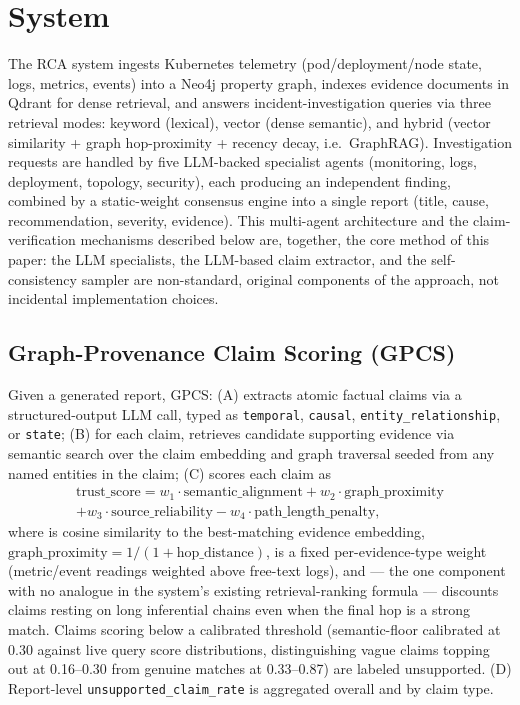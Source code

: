 \documentclass{article}
\begin{document}
\section{System}
\label{sec:system}

The RCA system ingests Kubernetes telemetry (pod/deployment/node state,
logs, metrics, events) into a Neo4j property graph, indexes evidence
documents in Qdrant for dense retrieval, and answers incident-investigation
queries via three retrieval modes: keyword (lexical), vector (dense
semantic), and hybrid (vector similarity + graph hop-proximity + recency
decay, i.e.\ GraphRAG). Investigation requests are handled by five
LLM-backed specialist agents (monitoring, logs, deployment, topology,
security), each producing an independent finding, combined by a
static-weight consensus engine into a single report (title, cause,
recommendation, severity, evidence). This multi-agent architecture and the
claim-verification mechanisms described below are, together, the core
method of this paper: the LLM specialists, the LLM-based claim extractor,
and the self-consistency sampler are non-standard, original components of
the approach, not incidental implementation choices.

\subsection{Graph-Provenance Claim Scoring (GPCS)}
\label{sec:gpcs}

Given a generated report, GPCS: (A) extracts atomic factual claims via a
structured-output LLM call, typed as \texttt{temporal}, \texttt{causal},
\texttt{entity\_relationship}, or \texttt{state}; (B) for each claim,
retrieves candidate supporting evidence via semantic search over the claim
embedding and graph traversal seeded from any named entities in the
claim; (C) scores each claim as
\begin{multline}
    \text{trust\_score} = w_1 \cdot \text{semantic\_alignment}
    + w_2 \cdot \text{graph\_proximity} \\
    + w_3 \cdot \text{source\_reliability}
    - w_4 \cdot \text{path\_length\_penalty},
    \label{eq:gpcs}
\end{multline}
where  is cosine similarity to the
best-matching evidence embedding, $\text{graph\_proximity} =
1/(1+\text{hop\_distance})$,  is a fixed
per-evidence-type weight (metric/event readings weighted above free-text
logs), and  --- the one component with no
analogue in the system's existing retrieval-ranking formula --- discounts
claims resting on long inferential chains even when the final hop is a
strong match. Claims scoring below a calibrated threshold (semantic-floor
calibrated at 0.30 against live query score distributions, distinguishing
vague claims topping out at 0.16--0.30 from genuine matches at
0.33--0.87) are labeled unsupported. (D) Report-level
\texttt{unsupported\_claim\_rate} is aggregated overall and by claim type.
\end{document}
